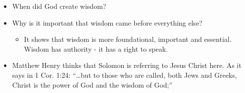 \documentclass[
]{book}
\providecommand{\tightlist}{%
  \setlength{\itemsep}{0pt}\setlength{\parskip}{0pt}}
\begin{document}
\begin{itemize}
\tightlist
\item
  When did God create wisdom?
\item
  Why is it important that wisdom came before everything else?

  \begin{itemize}
  \tightlist
  \item
    It shows that wisdom is more foundational, important and essential. Wisdom has authority - it has a right to speak.
  \end{itemize}
\item
  Matthew Henry thinks that Solomon is referring to Jesus Christ here. As it says in 1 Cor. 1:24: ``\ldots but to those who are called, both Jews and Greeks, Christ is the power of God and the wisdom of God;''
\end{itemize}
\end{document}
